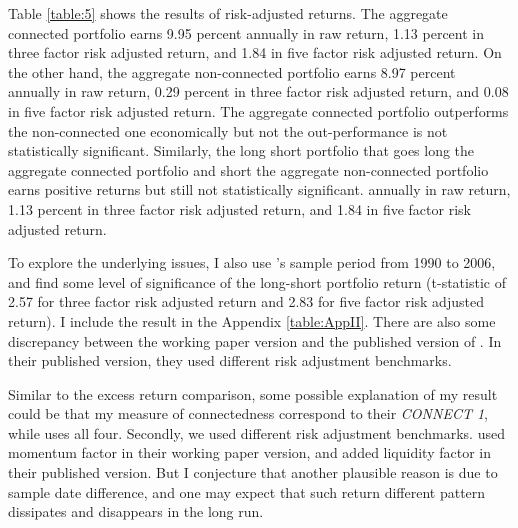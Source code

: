 \documentclass[11pt]{article}
\begin{document}
\begin{doublespace}
Table \ref{table:5} shows the results of risk-adjusted returns. The aggregate connected portfolio earns 9.95 percent annually in raw return, 1.13 percent in three factor risk adjusted return, and 1.84 in five factor risk adjusted return. On the other hand, the aggregate non-connected portfolio earns 8.97 percent annually in raw return, 0.29 percent in three factor risk adjusted return, and 0.08 in five factor risk adjusted return. The aggregate connected portfolio outperforms the non-connected one economically but not the out-performance is not statistically significant. Similarly, the long short portfolio that goes long the aggregate connected portfolio and short the aggregate non-connected portfolio earns positive returns but still not statistically significant. annually in raw return, 1.13 percent in three factor risk adjusted return, and 1.84 in five factor risk adjusted return. 

To explore the underlying issues, I also use \cite{cohen2008small}'s sample period from 1990 to 2006, and find some level of significance of the long-short portfolio return (t-statistic of 2.57 for three factor risk adjusted return and 2.83 for five factor risk adjusted return). I include the result in the Appendix \ref{table:AppII}. There are also some discrepancy between the working paper version and the published version of \cite{cohen2008small}. In their published version, they used different risk adjustment benchmarks. 

Similar to the excess return comparison, some possible explanation of my result could be that my measure of connectedness correspond to their \emph{CONNECT 1}, while \cite{cohen2008small} uses all four. Secondly, we used different risk adjustment benchmarks. \cite{cohen2008small} used momentum factor in their working paper version, and added liquidity factor in their published version. But I conjecture that another plausible reason is due to sample date difference, and one may expect that such return different pattern dissipates and disappears in the long run. 


\end{doublespace}
\end{document}

